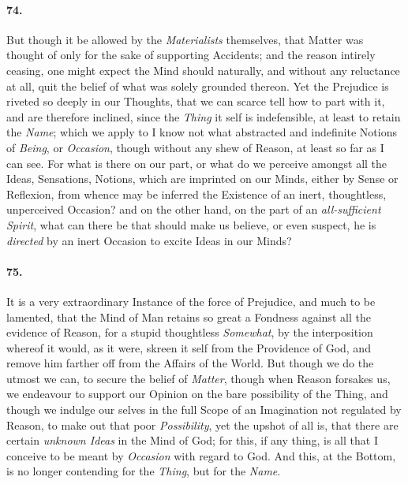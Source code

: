 \documentclass[]{article}
\newenvironment{sectionbody}{}{}
\begin{document}
\begin{sectionbody}
\paragraph{74.} But though it be allowed by the \emph{Materialists} themselves,
that Matter was thought of only for the sake of supporting
Accidents; and the reason intirely ceasing, one might expect the
Mind should naturally, and without any reluctance at all, quit
the belief of what was solely grounded thereon.  Yet the
Prejudice is riveted so deeply in our Thoughts, that we can
scarce tell how to part with it, and are therefore inclined,
since the \emph{Thing} it self is indefensible, at least to
retain the \emph{Name}; which we apply to I know not what
abstracted and indefinite Notions of \emph{Being}, or
\emph{Occasion}, though without any shew of Reason, at least so
far as I can see.  For what is there on our part, or what do we
perceive amongst all the Ideas, Sensations, Notions, which are
imprinted on our Minds, either by Sense or Reflexion, from whence
may be inferred the Existence of an inert, thoughtless,
unperceived Occasion? and on the other hand, on the part of an
\emph{all-sufficient Spirit}, what can there be that should
make us believe, or even suspect, he is \emph{directed} by an
inert Occasion to excite Ideas in our Minds?



\paragraph{75.} It is a very extraordinary Instance of the force of Prejudice,
and much to be lamented, that the Mind of Man retains so great a
Fondness against all the evidence of Reason, for a stupid
thoughtless \emph{Somewhat}, by the interposition whereof it
would, as it were, skreen it self from the Providence of God, and
remove him farther off from the Affairs of the World.  But though
we do the utmost we can, to secure the belief of \emph{Matter},
though when Reason forsakes us, we endeavour to support our
Opinion on the bare possibility of the Thing, and though we
indulge our selves in the full Scope of an Imagination not
regulated by Reason, to make out that poor \emph{Possibility},
yet the upshot of all is, that there are certain \emph{unknown
Ideas} in the Mind of God; for this, if any thing, is all
that I conceive to be meant by \emph{Occasion} with regard to
God.  And this, at the Bottom, is no longer contending for the
\emph{Thing}, but for the \emph{Name}.




\end{sectionbody}
\end{document}
